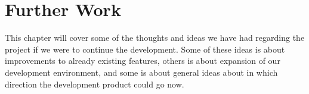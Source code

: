
\chapter{Further Work}
\label{cha:future_work}

This chapter will cover some of the thoughts and ideas we have had regarding the project if we were to continue the development. Some of these ideas is about improvements to already existing features, others is about expansion of our development environment, and some is about general ideas about in which direction the development product could go now. 













